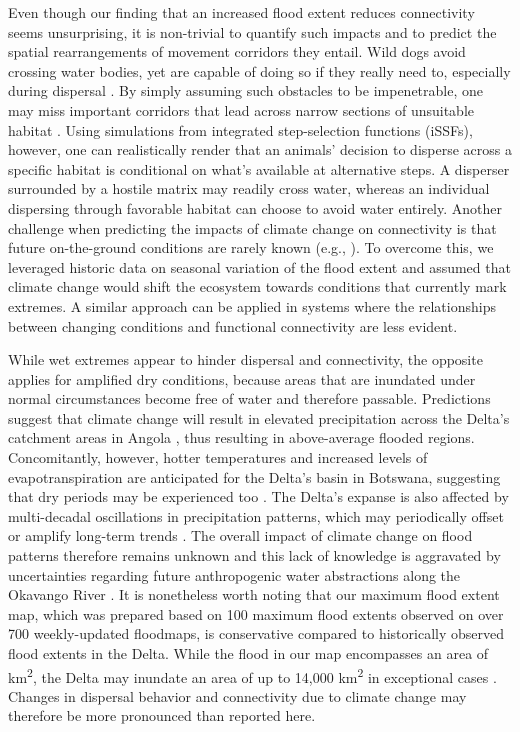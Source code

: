 \documentclass[../FinalThesis.tex]{subfiles}
\begin{document}
Even though our finding that an increased flood extent reduces connectivity
seems unsurprising, it is non-trivial to quantify such impacts and to predict
the spatial rearrangements of movement corridors they entail. Wild dogs avoid
crossing water bodies, yet are capable of doing so if they really need to,
especially during dispersal \citep{McNutt.1996, Cozzi.2013, Cozzi.2020,
Hofmann.2023}. By simply assuming such obstacles to be impenetrable, one may
miss important corridors that lead across narrow sections of unsuitable habitat
\citep{Marrec.2020}. Using simulations from integrated step-selection functions
(iSSFs), however, one can realistically render that an animals' decision to
disperse across a specific habitat is conditional on what's available at
alternative steps. A disperser surrounded by a hostile matrix may readily cross
water, whereas an individual dispersing through favorable habitat can choose to
avoid water entirely. Another challenge when predicting the impacts of climate
change on connectivity is that future on-the-ground conditions are rarely known
(e.g., \citealp{Wolski.2008}). To overcome this, we leveraged historic data on
seasonal variation of the flood extent and assumed that climate change would
shift the ecosystem towards conditions that currently mark extremes. A similar
approach can be applied in systems where the relationships between changing
conditions and functional connectivity are less evident.

While wet extremes appear to hinder dispersal and connectivity, the opposite
applies for amplified dry conditions, because areas that are inundated under
normal circumstances become free of water and therefore passable. Predictions
suggest that climate change will result in elevated precipitation across the
Delta's catchment areas in Angola \citep{Wolski.2008, IPCC.2022}, thus resulting
in above-average flooded regions. Concomitantly, however, hotter temperatures
and increased levels of evapotranspiration are anticipated for the Delta's basin
in Botswana, suggesting that dry periods may be experienced too
\citep{Wolski.2008, Moses.2018, Akinyemi.2019, IPCC.2022}. The Delta's expanse
is also affected by multi-decadal oscillations in precipitation patterns, which
may periodically offset or amplify long-term trends \citep{Wolski.2012}. The
overall impact of climate change on flood patterns therefore remains unknown
\citep{Wolski.2008, Wolski.2012} and this lack of knowledge is aggravated by
uncertainties regarding future anthropogenic water abstractions along the
Okavango River \citep{Kgathi.2006, Murray-Hudson.2006, Hughes.2011}. It is
nonetheless worth noting that our maximum flood extent map, which was prepared
based on 100 maximum flood extents observed on over 700 weekly-updated
floodmaps, is conservative compared to historically observed flood extents in
the Delta. While the flood in our map encompasses an area of
 km\textsuperscript{2}, the Delta may
inundate an area of up to 14,000 km\textsuperscript{2} in exceptional cases
\citep{McCarthy.2003, Gumbricht.2004}. Changes in dispersal behavior and
connectivity due to climate change may therefore be more pronounced than
reported here.
\end{document}
